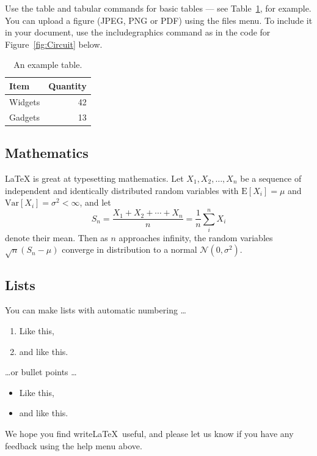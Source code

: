 \documentclass[12pt]{article}
\begin{document}
Use the table and tabular commands for basic tables --- see Table~\ref{tab:widgets}, for example. You can upload a figure (JPEG, PNG or PDF) using the files menu. To include it in your document, use the includegraphics command as in the code for Figure~\ref{fig:Circuit} below.


\begin{table}
\centering
\begin{tabular}{l|r}
Item & Quantity \\\hline
Widgets & 42 \\
Gadgets & 13
\end{tabular}
\caption{\label{tab:widgets}An example table.}
\end{table}

\subsection{Mathematics}

\LaTeX{} is great at typesetting mathematics. Let $X_1, X_2, \ldots, X_n$ be a sequence of independent and identically distributed random variables with $\text{E}[X_i] = \mu$ and $\text{Var}[X_i] = \sigma^2 < \infty$, and let
$$S_n = \frac{X_1 + X_2 + \cdots + X_n}{n}
      = \frac{1}{n}\sum_{i}^{n} X_i$$
denote their mean. Then as $n$ approaches infinity, the random variables $\sqrt{n}(S_n - \mu)$ converge in distribution to a normal $\mathcal{N}(0, \sigma^2)$.

\subsection{Lists}

You can make lists with automatic numbering \dots

\begin{enumerate}
\item Like this,
\item and like this.
\end{enumerate}
\dots or bullet points \dots
\begin{itemize}
\item Like this,
\item and like this.
\end{itemize}

We hope you find write\LaTeX\ useful, and please let us know if you have any feedback using the help menu above.



\end{document}
